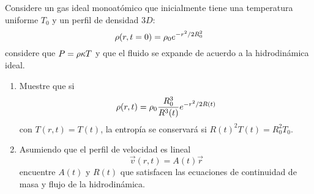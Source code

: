 \begin{ej}
	Considere un gas ideal monoatómico que inicialmente tiene una temperatura uniforme $T_0$ y un perfil de densidad $3D$:
	\begin{equation}
  \rho(r,t=0)=\rho_0e^{-r^2/2R_0^2}
\end{equation}
considere que $P=\rho\kappa T$ y que el fluido se expande de acuerdo a la hidrodinámica ideal.
\begin{enumerate}
	\item Muestre que si
	\begin{equation}
  \rho(r,t)=\rho_0\frac{R_0^3}{R^3(t)}e^{-r^2/2R(t)}
\end{equation}
con $T(r,t)=T(t)$, la entropía se conservará si $R(t)^2T(t)=R_0^2T_0$.

\item Asumiendo que el perfil de velocidad es lineal
\begin{equation}
  \vec{v}(r,t)=A(t)\vec{r}
\end{equation}
encuentre $A(t)$ y $R(t)$ que satisfacen las ecuaciones de continuidad de masa y flujo de la hidrodinámica.
\end{enumerate}
\end{ej}

